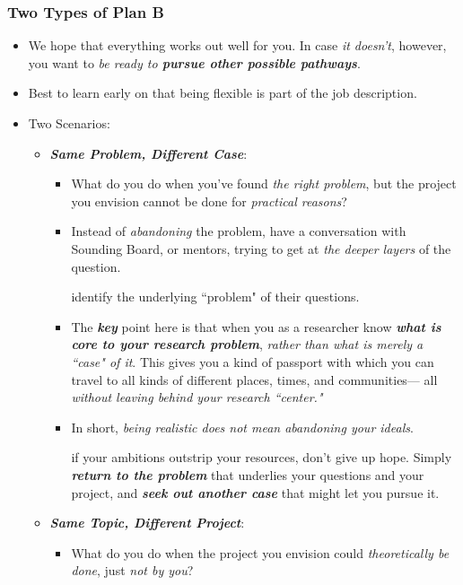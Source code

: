 \documentclass[11pt]{article}
\begin{document}
\subsubsection{Two Types of Plan B}
\begin{itemize}
\item We hope that everything works out well for you. In case \emph{it doesn’t}, however, you want to \emph{be ready to \textbf{pursue other possible pathways}}.

\item Best to learn early on that being flexible is part of the job description. 

\item Two Scenarios:
\begin{itemize}
\item \emph{\textbf{Same Problem, Different Case}}: 
\begin{itemize}
\item  What do you do when you’ve found \emph{the right problem}, but the project you envision cannot be done for \emph{practical reasons}?

\item Instead of \emph{abandoning} the problem, have a conversation with Sounding Board, or mentors, trying to get at \emph{the deeper layers} of the question. 

identify the underlying ``problem" of their questions.

\item The \emph{\textbf{key}} point here is that when you as a researcher know \emph{\textbf{what is core to your research problem}}, \emph{rather than what is merely a ``case" of it}. This gives you a kind of passport with which you can travel to all kinds of different places, times, and communities— all \emph{without leaving behind your research ``center."} 

\item In short, \emph{being realistic does not mean abandoning your ideals}.

if your ambitions outstrip your resources, don’t give up hope. Simply \emph{\textbf{return to the problem}} that underlies your questions and your project, and \emph{\textbf{seek out another case}} that might let you pursue it.
\end{itemize}

\item \emph{\textbf{Same Topic, Different Project}}: 
\begin{itemize}
\item What do you do when the project you envision could \emph{theoretically be done}, just \emph{not by you}?


\end{itemize}
\end{itemize}
\end{itemize}
\end{document}
